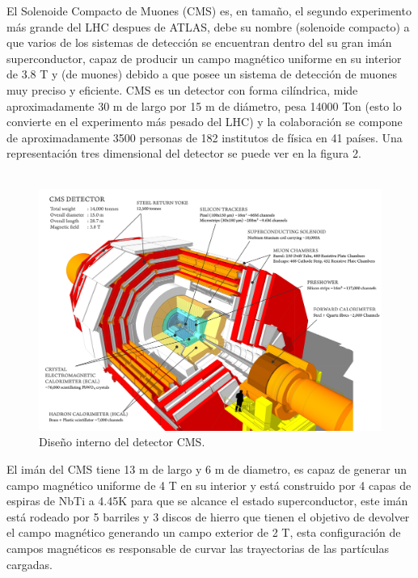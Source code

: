 El Solenoide Compacto de Muones (CMS) es, en tamaño, el segundo experimento más grande del LHC despues de ATLAS, debe su nombre (solenoide compacto) a que varios de los sistemas de detección se encuentran dentro del su gran imán superconductor, capaz de producir un campo magnético uniforme en su interior de 3.8 T y (de muones) debido a que posee un sistema de detección de muones muy preciso y eficiente. CMS es un detector con forma cilíndrica, mide aproximadamente 30 m de largo por 15 m de diámetro, pesa 14000 Ton (esto lo convierte en el experimento más pesado del LHC) y la colaboración se compone de aproximadamente 3500 personas de 182 institutos de física en 41 países. Una representación tres dimensional del detector se puede ver en la figura 2.
\\
\\
\begin{figure}
\centering
\includegraphics[width=15cm]{F2.png}
\caption{\label{fig:frog} Diseño interno del detector CMS.}
\end{figure}


El imán del CMS tiene 13 m de largo y 6 m de diametro, es capaz de generar un campo magnético uniforme de 4 T en su interior y está construido por 4 capas de espiras de NbTi a 4.45K para que se alcance el estado superconductor, este imán está rodeado por 5 barriles y 3 discos de hierro que tienen el objetivo de devolver el campo magnético generando un campo exterior de 2 T,  esta configuración de campos magnéticos es responsable de curvar las trayectorias de las partículas cargadas.
\\
\\

